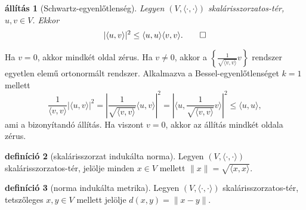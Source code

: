 \documentclass[9pt, a4paper, showtrims]{memoir}
\makeatletter
\renewenvironment{proof}[1][\proofname]
    {\par\pushQED{\qed}%
    \normalfont \topsep6\p@\@plus6\p@\relax
    \trivlist
    \item[\hskip\labelsep
        \itshape
    #1\@addpunct{:}]\ignorespaces}
    {\popQED\endtrivlist\@endpefalse}
\theoremstyle{plain}
\newtheorem{proposition}{állítás}[chapter]
\theoremstyle{remark}
\theoremstyle{definition}
\newtheorem{definition}[proposition]{definíció}
\newcommand{\ip}[2]{\langle#1,#2\rangle}
\makeatother
\begin{document}
\begin{proposition}[Schwartz-egyenlőtlenség]
    Legyen $\left( V,\ip{\cdot}{\cdot} \right)$ skalárisszorzatos-tér,
    $u,v\in V$.
    Ekkor 
    \[
        |\ip{u}{v}|^2\leq \ip{u}{u}\ip{v}{v}.\qedhere
    \]
\end{proposition}
\begin{proof}
    Ha $v=0$, akkor mindkét oldal zérus.
    Ha $v\neq 0$, akkor a $\left\{ \frac{1}{\sqrt{\ip{v}{v}}}v \right\}$ rendszer egyetlen elemű ortonormált rendszer.
    Alkalmazva a Bessel-egyenlőtlenséget $k=1$ mellett
    \[
        \frac{1}{\ip{v}{v}}
        \left|\ip{u}{v}\right|^2
        =
        \left|\frac{1}{\sqrt{\ip{v}{v}}}
        \ip{u}{v}\right|^2
        =
        \left|\ip{u}{\frac{1}{\sqrt{\ip{v}{v}}}v}\right|^2
        \leq \ip{u}{u},
    \]
    ami a bizonyítandó állítás. 
    Ha viszont $v=0$,
    akkor az állítás mindkét oldala zérus.
\end{proof}
\begin{definition}[skalárisszorzat indukálta norma]
    Legyen $\left( V,\ip{\cdot}{\cdot} \right)$ skalárisszorzatos-tér,
    jelölje minden $x\in V$ mellett $\|x\|=\sqrt{\ip{x}{x}}$.
\end{definition}
\begin{definition}[norma indukálta metrika]
    Legyen $\left( V,\ip{\cdot}{\cdot} \right)$ skalárisszorzatos-tér,
    tetszőleges $x,y\in V$ mellett jelölje $d\left( x,y \right)=\|x-y\|$.
\end{definition}
\end{document}
